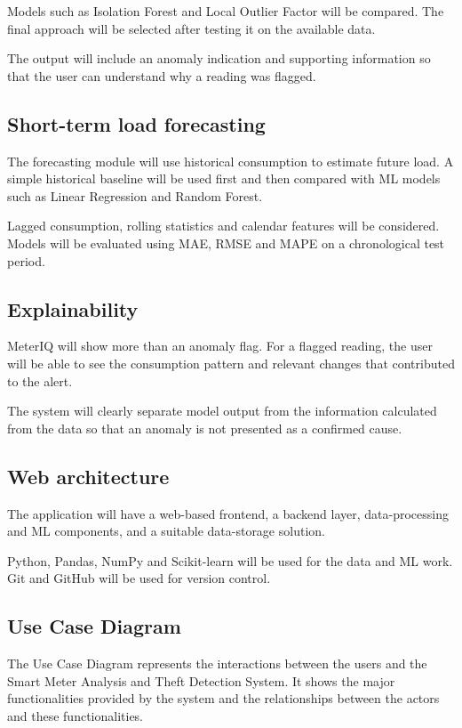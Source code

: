 \documentclass[11pt,a4paper]{article}
\begin{document}
Models such as Isolation Forest and Local Outlier Factor will be
compared. The final approach will be selected after testing it on
the available data.

The output will include an anomaly indication and supporting
information so that the user can understand why a reading was
flagged.

\subsection{Short-term load forecasting}

The forecasting module will use historical consumption to estimate
future load. A simple historical baseline will be used first and
then compared with ML models such as Linear Regression and Random
Forest.

Lagged consumption, rolling statistics and calendar features will be
considered. Models will be evaluated using MAE, RMSE and MAPE on a
chronological test period.

\subsection{Explainability}

MeterIQ will show more than an anomaly flag. For a flagged reading,
the user will be able to see the consumption pattern and relevant
changes that contributed to the alert.

The system will clearly separate model output from the information
calculated from the data so that an anomaly is not presented as a
confirmed cause.

\subsection{Web architecture}

The application will have a web-based frontend, a backend layer,
data-processing and ML components, and a suitable data-storage
solution.

Python, Pandas, NumPy and Scikit-learn will be used for the data and
ML work. Git and GitHub will be used for version control.

\subsection{Use Case Diagram}

The Use Case Diagram represents the interactions between the users and the Smart Meter Analysis and Theft Detection System. It shows the major functionalities provided by the system and the relationships between the actors and these functionalities.
\end{document}
